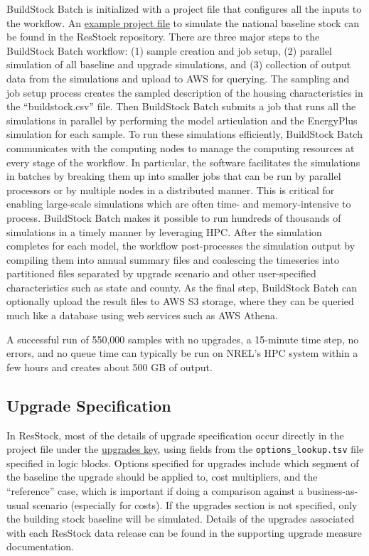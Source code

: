 BuildStock Batch is initialized with a project file that configures all the inputs to the workflow. An \href{https://github.com/NREL/resstock/blob/develop/project_national/national_baseline.yml}{example project file} to simulate the national baseline stock can be found in the ResStock repository. There are three major steps to the BuildStock Batch workflow: (1) sample creation and job setup, (2) parallel simulation of all baseline and upgrade simulations, and (3) collection of output data from the simulations and upload to AWS for querying. The sampling and job setup process creates the sampled description of the housing characteristics in the ``buildstock.csv'' file. Then BuildStock Batch submits a job that runs all the simulations in parallel by performing the model articulation and the EnergyPlus simulation for each sample. To run these simulations efficiently, BuildStock Batch communicates with the computing nodes to manage the computing resources at every stage of the workflow. In particular, the software facilitates the simulations in batches by breaking them up into smaller jobs that can be run by parallel processors or by multiple nodes in a distributed manner. This is critical for enabling large-scale simulations which are often time- and memory-intensive to process. BuildStock Batch makes it possible to run hundreds of thousands of simulations in a timely manner by leveraging HPC. After the simulation completes for each model, the workflow post-processes the simulation output by compiling them into annual summary files and coalescing the timeseries into partitioned files separated by upgrade scenario and other user-specified characteristics such as state and county. As the final step, BuildStock Batch can optionally upload the result files to AWS S3 storage, where they can be queried much like a database using web services such as AWS Athena.

A successful run of 550,000 samples with no upgrades, a 15-minute time step, no errors, and no queue time can typically be run on NREL's HPC system within a few hours and creates about 500 GB of output. 

\subsection{Upgrade Specification}\label{sec:upgrades}
In ResStock, most of the details of upgrade specification occur directly in the project file under the \href{https://buildstockbatch.readthedocs.io/en/v2023.10.0/project_defn.html#upgrade-scenarios}{upgrades key}, using fields from the \texttt{options\_lookup.tsv} file specified in logic blocks. Options specified for upgrades include which segment of the baseline the upgrade should be applied to, cost multipliers, and the ``reference'' case, which is important if doing a comparison against a business-as-usual scenario (especially for costs). If the upgrades section is not specified, only the building stock baseline will be simulated. Details of the upgrades associated with each ResStock data release can be found in the supporting upgrade measure documentation.

